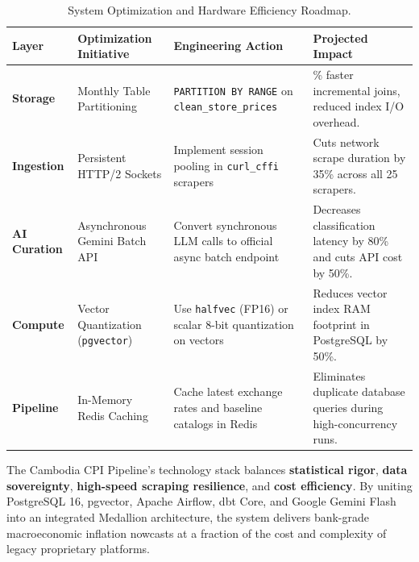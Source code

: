 \documentclass[a4paper, 11pt]{article}
\begin{document}
\begin{table}[H]
\centering
\small
\setlength{\tabcolsep}{4.5pt}
\begin{tabularx}{\textwidth}{@{}l >{\raggedright\arraybackslash}p{3.2cm} >{\raggedright\arraybackslash}p{3.8cm} >{\raggedright\arraybackslash}X@{}}
\toprule
\textbf{Layer} & \textbf{Optimization Initiative} & \textbf{Engineering Action} & \textbf{Projected Impact} \\
\midrule
\textbf{Storage} & Monthly Table Partitioning & \texttt{PARTITION BY RANGE} on \texttt{clean\_store\_prices} & 60\% faster incremental joins, reduced index I/O overhead. \\
\addlinespace[2pt]
\textbf{Ingestion} & Persistent HTTP/2 Sockets & Implement session pooling in \texttt{curl\_cffi} scrapers & Cuts network scrape duration by 35\% across all 25 scrapers. \\
\addlinespace[2pt]
\textbf{AI Curation} & Asynchronous Gemini Batch API & Convert synchronous LLM calls to official async batch endpoint & Decreases classification latency by 80\% and cuts API cost by 50\%. \\
\addlinespace[2pt]
\textbf{Compute} & Vector Quantization (\texttt{pgvector}) & Use \texttt{halfvec} (FP16) or scalar 8-bit quantization on vectors & Reduces vector index RAM footprint in PostgreSQL by 50\%. \\
\addlinespace[2pt]
\textbf{Pipeline} & In-Memory Redis Caching & Cache latest exchange rates and baseline catalogs in Redis & Eliminates duplicate database queries during high-concurrency runs. \\
\bottomrule
\end{tabularx}
\caption{System Optimization and Hardware Efficiency Roadmap.}
\end{table}

\vspace{0.8cm}
\begin{tcolorbox}[colback=primaryblue!10, colframe=primaryblue, title=Architecture Synthesis Conclusion]
The Cambodia CPI Pipeline’s technology stack balances \textbf{statistical rigor}, \textbf{data sovereignty}, \textbf{high-speed scraping resilience}, and \textbf{cost efficiency}. By uniting PostgreSQL 16, pgvector, Apache Airflow, dbt Core, and Google Gemini Flash into an integrated Medallion architecture, the system delivers bank-grade macroeconomic inflation nowcasts at a fraction of the cost and complexity of legacy proprietary platforms.
\end{tcolorbox}
\end{document}
